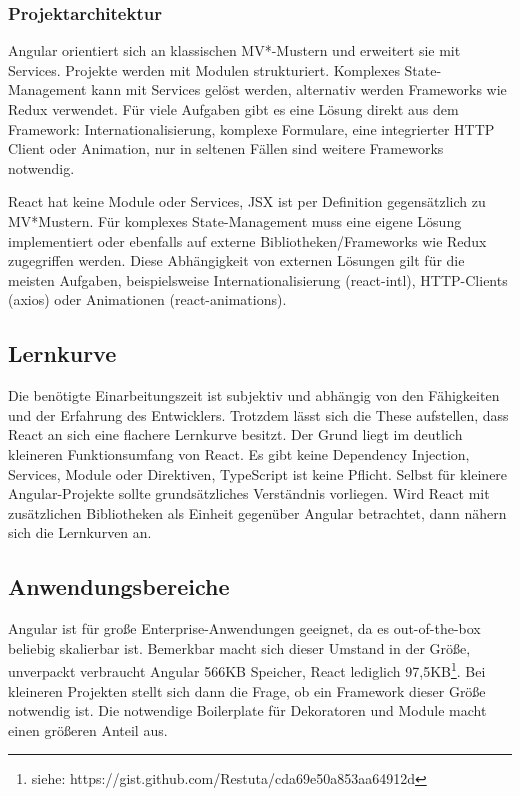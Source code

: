 \subsubsection{Projektarchitektur}
Angular orientiert sich an klassischen MV*-Mustern und erweitert sie mit Services. Projekte werden mit Modulen strukturiert. Komplexes State-Management kann mit Services gelöst werden, alternativ werden Frameworks wie Redux verwendet. Für viele Aufgaben gibt es eine Lösung direkt aus dem Framework: Internationalisierung, komplexe Formulare, eine integrierter HTTP Client oder Animation, nur in seltenen Fällen sind weitere Frameworks notwendig.

React hat keine Module oder Services, JSX ist per Definition gegensätzlich zu MV*Mustern. Für komplexes State-Management muss eine eigene Lösung implementiert oder ebenfalls auf externe Bibliotheken/Frameworks wie Redux zugegriffen werden. Diese Abhängigkeit von externen Lösungen gilt für die meisten Aufgaben, beispielsweise Internationalisierung (react-intl), HTTP-Clients (axios) oder Animationen (react-animations).

\subsection{Lernkurve}
Die benötigte Einarbeitungszeit ist subjektiv und abhängig von den Fähigkeiten und der Erfahrung des Entwicklers. Trotzdem lässt sich die These aufstellen, dass React an sich eine flachere Lernkurve besitzt. Der Grund liegt im deutlich kleineren Funktionsumfang von React. Es gibt keine Dependency Injection, Services, Module oder Direktiven, TypeScript ist keine Pflicht. Selbst für kleinere Angular-Projekte sollte grundsätzliches Verständnis vorliegen. Wird React mit zusätzlichen Bibliotheken als Einheit gegenüber Angular betrachtet, dann nähern sich die Lernkurven an.

\subsection{Anwendungsbereiche}
Angular ist für große Enterprise-Anwendungen geeignet, da es out-of-the-box beliebig skalierbar ist. Bemerkbar macht sich dieser Umstand in der Größe, unverpackt verbraucht Angular 566KB Speicher, React lediglich 97,5KB\footnote{siehe: https://gist.github.com/Restuta/cda69e50a853aa64912d}. Bei kleineren Projekten stellt sich dann die Frage, ob ein Framework dieser Größe notwendig ist. Die notwendige Boilerplate für Dekoratoren und Module macht einen größeren Anteil aus.

